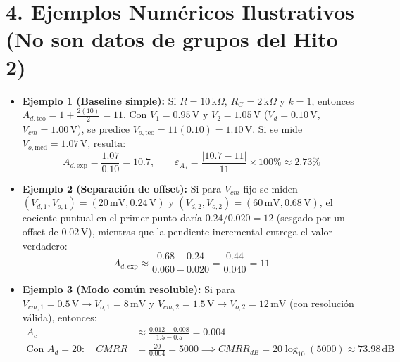 \documentclass[11pt, a4paper]{article}
\begin{document}
\section*{4. Ejemplos Numéricos Ilustrativos (No son datos de grupos del Hito 2)}
\begin{itemize}
    \item \textbf{Ejemplo 1 (Baseline simple):} Si $R=10\,\text{k}\Omega$, $R_G=2\,\text{k}\Omega$ y $k=1$, entonces $A_{d,\mathrm{teo}} = 1 + \frac{2(10)}{2} = 11$. Con $V_1=0.95\,\text{V}$ y $V_2=1.05\,\text{V}$ ($V_d=0.10\,\text{V}$, $V_{cm}=1.00\,\text{V}$), se predice $V_{o,\mathrm{teo}} = 11(0.10) = 1.10\,\text{V}$. Si se mide $V_{o,\mathrm{med}} = 1.07\,\text{V}$, resulta:
    \begin{equation*}
        A_{d,\mathrm{exp}} = \frac{1.07}{0.10} = 10.7, \qquad \varepsilon_{A_d} = \frac{|10.7 - 11|}{11} \times 100\% \approx 2.73\%
    \end{equation*}
    \item \textbf{Ejemplo 2 (Separación de offset):} Si para $V_{cm}$ fijo se miden $(V_{d,1}, V_{o,1}) = (20\,\text{mV}, 0.24\,\text{V})$ y $(V_{d,2}, V_{o,2}) = (60\,\text{mV}, 0.68\,\text{V})$, el cociente puntual en el primer punto daría $0.24/0.020 = 12$ (sesgado por un offset de $0.02\,\text{V}$), mientras que la pendiente incremental entrega el valor verdadero:
    \begin{equation*}
        A_{d,\mathrm{exp}} \approx \frac{0.68 - 0.24}{0.060 - 0.020} = \frac{0.44}{0.040} = 11
    \end{equation*}
    \item \textbf{Ejemplo 3 (Modo común resoluble):} Si para $V_{cm,1}=0.5\,\text{V} \rightarrow V_{o,1}=8\,\text{mV}$ y $V_{cm,2}=1.5\,\text{V} \rightarrow V_{o,2}=12\,\text{mV}$ (con resolución válida), entonces:
    \begin{align*}
        A_c &\approx \frac{0.012 - 0.008}{1.5 - 0.5} = 0.004 \\
        \text{Con } A_d = 20:\quad CMRR &= \frac{20}{0.004} = 5000 \implies CMRR_{dB} = 20\log_{10}(5000) \approx 73.98\,\text{dB}
    \end{align*}
\end{itemize}
\end{document}

